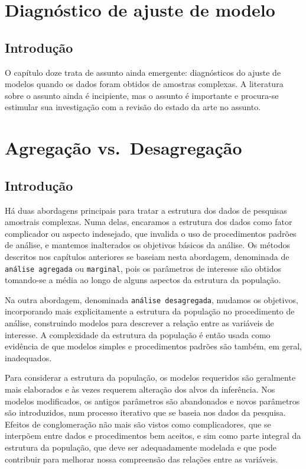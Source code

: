 \documentclass[]{book}
\numberwithin{example}{chapter}
\numberwithin{remark}{chapter}
\numberwithin{definition}{chapter}
\begin{document}
\chapter{Diagnóstico de ajuste de
modelo}\label{diagnostico-de-ajuste-de-modelo}

\section{Introdução}\label{introducao-6}

O capítulo doze trata de assunto ainda emergente: diagnósticos do ajuste
de modelos quando os dados foram obtidos de amostras complexas. A
literatura sobre o assunto ainda é incipiente, mas o assunto é
importante e procura-se estimular sua investigação com a revisão do
estado da arte no assunto.

\chapter{Agregação vs.~Desagregação}\label{agregdesag}

\section{Introdução}\label{introducao-7}

Há duas abordagens principais para tratar a estrutura dos dados de
pesquisas amostrais complexas. Numa delas, encaramos a estrutura dos
dados como fator complicador ou aspecto indesejado, que invalida o uso
de procedimentos padrões de análise, e mantemos inalterados os objetivos
básicos da análise. Os métodos descritos nos capítulos anteriores se
baseiam nesta abordagem, denominada de \texttt{análise\ agregada} ou
\texttt{marginal}, pois os parâmetros de interesse são obtidos
tomando-se a média ao longo de alguns aspectos da estrutura da
população.

Na outra abordagem, denominada \texttt{análise\ desagregada}, mudamos os
objetivos, incorporando mais explicitamente a estrutura da população no
procedimento de análise, construindo modelos para descrever a relação
entre as variáveis de interesse. A complexidade da estrutura da
população é então usada como evidência de que modelos simples e
procedimentos padrões são também, em geral, inadequados.

Para considerar a estrutura da população, os modelos requeridos são
geralmente mais elaborados e às vezes requerem alteração dos alvos da
inferência. Nos modelos modificados, os antigos parâmetros são
abandonados e novos parâmetros são introduzidos, num processo iterativo
que se baseia nos dados da pesquisa. Efeitos de conglomeração não mais
são vistos como complicadores, que se interpõem entre dados e
procedimentos bem aceitos, e sim como parte integral da estrutura da
população, que deve ser adequadamente modelada e que pode contribuir
para melhorar nossa compreensão das relações entre as variáveis.
\end{document}
